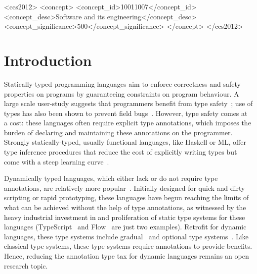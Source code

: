 \documentclass[acmsmall, review, anonymous]{acmart}\settopmatter{printfolios=true,printccs=false,printacmref=false}
\begin{document}
\begin{CCSXML}
<ccs2012>
<concept>
<concept_id>10011007</concept_id>
<concept_desc>Software and its engineering</concept_desc>
<concept_significance>500</concept_significance>
</concept>
</ccs2012>
\end{CCSXML}




\maketitle

\section{Introduction}

Statically-typed programming languages aim to enforce correctness and safety properties
on programs by guaranteeing constraints on program behaviour.
A large scale user-study
suggests that programmers
benefit from type safety~\citep{hanenberg14}; use of types has also been
shown to prevent field bugs~\citep{gao17}.
However, type safety comes at a cost: these languages often require explicit type annotations,
which imposes the burden of declaring and maintaining these annotations on the programmer.
Strongly statically-typed, usually functional languages, like Haskell or ML,
offer type inference procedures that reduce
the cost of explicitly writing types but come with
a steep learning curve~\citep{tirronen15}.

Dynamically typed languages, which either lack or do not require type
annotations, are relatively more popular~\cite{meyerovich12}.  Initially
designed for quick and dirty scripting or rapid prototyping, these languages
have begun reaching the limits of what can be achieved without the help of type
annotations, as witnessed by the heavy industrial investment in and proliferation of static type systems for these languages (TypeScript~\cite{typescript} and Flow~\cite{flow} are just two
examples).
Retrofit for dynamic languages, these type systems include gradual~\cite{siek06}
and optional type systems~\citep{bracha2004pluggable}.  Like classical type systems, these type systems
require annotations to provide benefits.  Hence, reducing the annotation type tax
for dynamic languages remains an open research topic.
\end{document}
